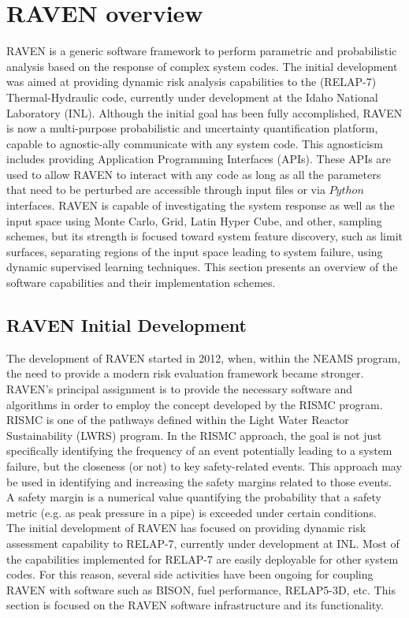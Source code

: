 \section{RAVEN overview}
RAVEN  is a generic software framework to perform parametric and probabilistic analysis based on the response of complex system codes. The initial development was aimed at providing dynamic risk analysis capabilities to the (RELAP-7) Thermal-Hydraulic code, currently under development at the Idaho National Laboratory (INL). Although the initial goal has been fully accomplished, RAVEN is now a multi-purpose probabilistic and uncertainty quantification platform, capable to agnostic-ally communicate with any system code. This agnosticism includes providing Application Programming Interfaces (APIs). These APIs are used to allow RAVEN to interact with any code as long as all the parameters that need to be perturbed are accessible through input files or via  $Python$ interfaces. RAVEN is capable of investigating the system response as well as the input space using Monte Carlo, Grid, Latin Hyper Cube, and other, sampling schemes, but its strength is focused toward system feature discovery, such as limit surfaces, separating regions of the input space leading to system failure, using dynamic supervised learning techniques. This section presents an overview of the software capabilities and their implementation schemes. 

\subsection{RAVEN Initial Development}
The development of RAVEN started in 2012, when, within the NEAMS program, the need to provide a modern risk evaluation framework became stronger. RAVEN’s principal assignment is to provide the necessary software and algorithms in order to employ the concept developed by the RISMC program. RISMC is one of the pathways defined within the Light Water Reactor Sustainability (LWRS) program. In the RISMC approach, the goal is not just specifically identifying the frequency of an event potentially leading to a system failure, but the closeness (or not) to key safety-related events. This approach may be used in identifying and increasing the safety margins related to those events. A safety margin is a numerical value quantifying the probability that a safety metric (e.g. as peak pressure in a pipe) is exceeded under certain conditions.
\\The initial development of RAVEN has focused on providing dynamic risk assessment capability to RELAP-7, currently under development at INL.
Most of the capabilities implemented for RELAP-7 are easily deployable for other system codes. For this reason, several side activities have been ongoing for coupling RAVEN with software such as BISON, fuel performance, RELAP5-3D, etc. This section is focused on the RAVEN software infrastructure and its functionality.



